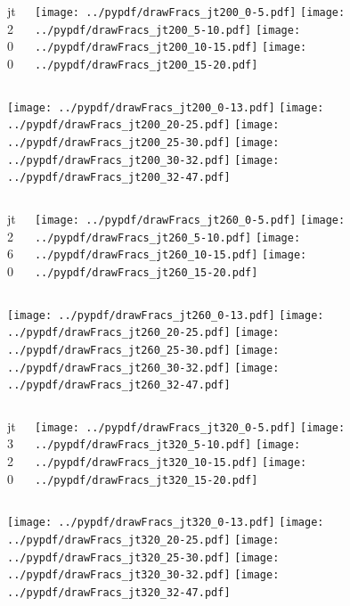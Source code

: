 \documentclass[aspectratio=169]{beamer}
\begin{document}
\begin{figure}[p]
\flushleft
\begin{columns}[T]
\begin{column}{.2\linewidth}
\centering
jt200
\end{column}
\begin{column}{.8\linewidth}
\texttt{[image: ../pypdf/drawFracs\_jt200\_0-5.pdf]}
\texttt{[image: ../pypdf/drawFracs\_jt200\_5-10.pdf]}
\texttt{[image: ../pypdf/drawFracs\_jt200\_10-15.pdf]}
\texttt{[image: ../pypdf/drawFracs\_jt200\_15-20.pdf]}
\end{column}
\end{columns}
\texttt{[image: ../pypdf/drawFracs\_jt200\_0-13.pdf]}
\texttt{[image: ../pypdf/drawFracs\_jt200\_20-25.pdf]}
\texttt{[image: ../pypdf/drawFracs\_jt200\_25-30.pdf]}
\texttt{[image: ../pypdf/drawFracs\_jt200\_30-32.pdf]}
\texttt{[image: ../pypdf/drawFracs\_jt200\_32-47.pdf]}
\end{figure}

\begin{figure}[p]
\flushleft
\begin{columns}[T]
\begin{column}{.2\linewidth}
\centering
jt260
\end{column}
\begin{column}{.8\linewidth}
\texttt{[image: ../pypdf/drawFracs\_jt260\_0-5.pdf]}
\texttt{[image: ../pypdf/drawFracs\_jt260\_5-10.pdf]}
\texttt{[image: ../pypdf/drawFracs\_jt260\_10-15.pdf]}
\texttt{[image: ../pypdf/drawFracs\_jt260\_15-20.pdf]}
\end{column}
\end{columns}
\texttt{[image: ../pypdf/drawFracs\_jt260\_0-13.pdf]}
\texttt{[image: ../pypdf/drawFracs\_jt260\_20-25.pdf]}
\texttt{[image: ../pypdf/drawFracs\_jt260\_25-30.pdf]}
\texttt{[image: ../pypdf/drawFracs\_jt260\_30-32.pdf]}
\texttt{[image: ../pypdf/drawFracs\_jt260\_32-47.pdf]}
\end{figure}

\begin{figure}[p]
\flushleft
\begin{columns}[T]
\begin{column}{.2\linewidth}
\centering
jt320
\end{column}
\begin{column}{.8\linewidth}
\texttt{[image: ../pypdf/drawFracs\_jt320\_0-5.pdf]}
\texttt{[image: ../pypdf/drawFracs\_jt320\_5-10.pdf]}
\texttt{[image: ../pypdf/drawFracs\_jt320\_10-15.pdf]}
\texttt{[image: ../pypdf/drawFracs\_jt320\_15-20.pdf]}
\end{column}
\end{columns}
\texttt{[image: ../pypdf/drawFracs\_jt320\_0-13.pdf]}
\texttt{[image: ../pypdf/drawFracs\_jt320\_20-25.pdf]}
\texttt{[image: ../pypdf/drawFracs\_jt320\_25-30.pdf]}
\texttt{[image: ../pypdf/drawFracs\_jt320\_30-32.pdf]}
\texttt{[image: ../pypdf/drawFracs\_jt320\_32-47.pdf]}
\end{figure}
\end{document}
